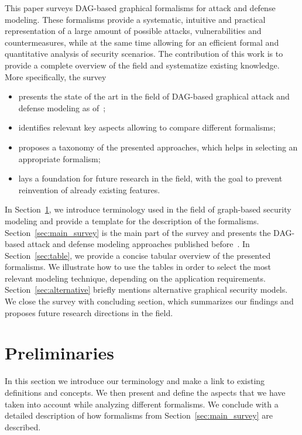 \documentclass[a4paper]{article}
\begin{document}
This paper surveys DAG-based graphical formalisms for attack and defense 
modeling. These formalisms provide a systematic, intuitive and practical
representation of a large amount of possible attacks, vulnerabilities and
countermeasures, while at the same time allowing for an efficient formal and
quantitative analysis of security scenarios. 
The contribution of this work is to 
provide a complete overview of the field and systematize  existing 
knowledge. More specifically, the survey 

\begin{itemize}
\item presents the state of the art in the field of DAG-based
graphical attack and defense modeling as of~;
\item identifies relevant key aspects allowing to compare different formalisms;
\item proposes a taxonomy of the presented approaches, which helps in selecting
an appropriate formalism;
\item lays a foundation for future research in the field, with the goal to
prevent reinvention of already existing features.
\end{itemize}

In Section~\ref{sec:prelims}, we introduce terminology used in the field of
graph-based security modeling and provide a template for the description of the
formalisms. Section~\ref{sec:main_survey} is the main part of the survey and
presents the DAG-based attack and defense modeling approaches published
before~. In Section~\ref{sec:table}, we provide a concise tabular 
overview of the presented formalisms. We illustrate how to use the tables in
order to select the most relevant modeling technique, depending on the
application requirements. Section~\ref{sec:alternative} briefly mentions
alternative  graphical security models. We close the survey with concluding
section, which  summarizes our findings and proposes future research directions 
in the field. 

\section{Preliminaries}
\label{sec:prelims}

In this section we introduce our terminology and make a link to existing 
definitions and concepts. We then present and define the aspects that we have
taken into account while analyzing different formalisms. We conclude with a
detailed description of how formalisms from Section~\ref{sec:main_survey} are
described. 
\end{document}
